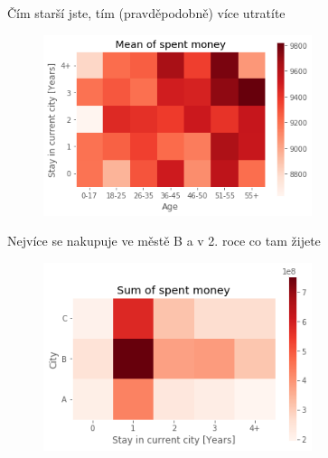 \documentclass[11pt]{beamer}
\begin{document}
\begin{frame}{Čím starší jste, tím (pravděpodobně) více utratíte}
\begin{figure}
	\includegraphics[width=0.7\textwidth,keepaspectratio]{black-friday_24_0}
\end{figure}
\end{frame}

\begin{frame}{Nejvíce se nakupuje ve městě B a v 2. roce co tam žijete}
\begin{figure}
	\includegraphics[width=0.7\textwidth,keepaspectratio]{black-friday_28_0}
\end{figure}
\end{frame}
\end{document}
